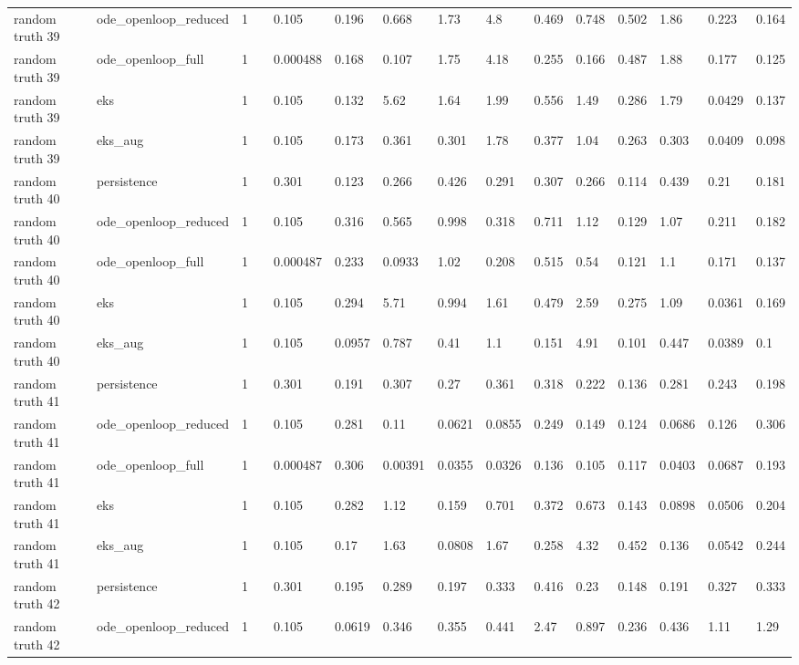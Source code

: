 \begin{table}[t]
\begin{tabular}{lllllllllllllll}
random truth 39 & ode\_openloop\_reduced & 1 &  & 0.105 & 0.196 & 0.668 & 1.73 & 4.8 & 0.469 & 0.748 & 0.502 & 1.86 & 0.223 & 0.164 \\
random truth 39 & ode\_openloop\_full & 1 &  & 0.000488 & 0.168 & 0.107 & 1.75 & 4.18 & 0.255 & 0.166 & 0.487 & 1.88 & 0.177 & 0.125 \\
random truth 39 & eks & 1 &  & 0.105 & 0.132 & 5.62 & 1.64 & 1.99 & 0.556 & 1.49 & 0.286 & 1.79 & 0.0429 & 0.137 \\
random truth 39 & eks\_aug & 1 &  & 0.105 & 0.173 & 0.361 & 0.301 & 1.78 & 0.377 & 1.04 & 0.263 & 0.303 & 0.0409 & 0.098 \\
random truth 40 & persistence & 1 &  & 0.301 & 0.123 & 0.266 & 0.426 & 0.291 & 0.307 & 0.266 & 0.114 & 0.439 & 0.21 & 0.181 \\
random truth 40 & ode\_openloop\_reduced & 1 &  & 0.105 & 0.316 & 0.565 & 0.998 & 0.318 & 0.711 & 1.12 & 0.129 & 1.07 & 0.211 & 0.182 \\
random truth 40 & ode\_openloop\_full & 1 &  & 0.000487 & 0.233 & 0.0933 & 1.02 & 0.208 & 0.515 & 0.54 & 0.121 & 1.1 & 0.171 & 0.137 \\
random truth 40 & eks & 1 &  & 0.105 & 0.294 & 5.71 & 0.994 & 1.61 & 0.479 & 2.59 & 0.275 & 1.09 & 0.0361 & 0.169 \\
random truth 40 & eks\_aug & 1 &  & 0.105 & 0.0957 & 0.787 & 0.41 & 1.1 & 0.151 & 4.91 & 0.101 & 0.447 & 0.0389 & 0.1 \\
random truth 41 & persistence & 1 &  & 0.301 & 0.191 & 0.307 & 0.27 & 0.361 & 0.318 & 0.222 & 0.136 & 0.281 & 0.243 & 0.198 \\
random truth 41 & ode\_openloop\_reduced & 1 &  & 0.105 & 0.281 & 0.11 & 0.0621 & 0.0855 & 0.249 & 0.149 & 0.124 & 0.0686 & 0.126 & 0.306 \\
random truth 41 & ode\_openloop\_full & 1 &  & 0.000487 & 0.306 & 0.00391 & 0.0355 & 0.0326 & 0.136 & 0.105 & 0.117 & 0.0403 & 0.0687 & 0.193 \\
random truth 41 & eks & 1 &  & 0.105 & 0.282 & 1.12 & 0.159 & 0.701 & 0.372 & 0.673 & 0.143 & 0.0898 & 0.0506 & 0.204 \\
random truth 41 & eks\_aug & 1 &  & 0.105 & 0.17 & 1.63 & 0.0808 & 1.67 & 0.258 & 4.32 & 0.452 & 0.136 & 0.0542 & 0.244 \\
random truth 42 & persistence & 1 &  & 0.301 & 0.195 & 0.289 & 0.197 & 0.333 & 0.416 & 0.23 & 0.148 & 0.191 & 0.327 & 0.333 \\
random truth 42 & ode\_openloop\_reduced & 1 &  & 0.105 & 0.0619 & 0.346 & 0.355 & 0.441 & 2.47 & 0.897 & 0.236 & 0.436 & 1.11 & 1.29 \\

\end{tabular}
\end{table}
